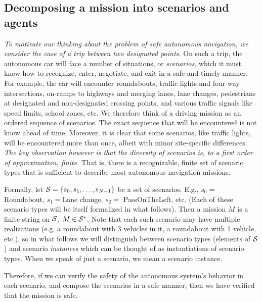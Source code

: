 \subsection{Decomposing a mission into scenarios and agents}
\label{scenarios and agents}
{\it To motivate our thinking about the problem of safe autonomous navigation, we consider the case of a trip between two designated points.}
On such a trip, the autonomous car will face a number of situations, or \emph{scenarios}, which it must know how to recognize, enter, negotiate, and exit in a safe and timely manner.
For example, the car will encounter roundabouts, 
traffic lights and four-way intersections, 
on-ramps to highways and merging lanes, 
lane changes, 
pedestrians at designated and non-designated crossing points,  
and various traffic signals like speed limits, school zones, etc.
We therefore think of a driving mission as an ordered sequence of scenarios.
The exact sequence that will be encountered is not know ahead of time. 
Moreover, it is clear that some scenarios, like traffic lights, will be encountered more than once, albeit with minor site-specific differences. 
{\it The key observation however is that the diversity of scenarios is, to a first order of approximation, finite.} 
That is, there is a recognizable, finite set of scenario types that is sufficient to describe most autonomous navigation missions.

Formally, let $\mathcal{S} = \{s_0,s_1,\ldots,s_{N-1}\}$ be a set of scenarios. 
E.g., $s_0 = $ Roundabout, $s_1 = $Lane change, $s_2 = $ PassOnTheLeft, etc. 
(Each of these scenario types will be itself formalized in what follows).
Then a mission $M$ is a finite string on $\mathcal{S}$, $M \in \mathcal{S}^*$.
Note that each such scenario may have multiple realizations (e.g. a roundabout with 3 vehicles in it, a roundabout with 1 vehicle, etc.), so in what follows we will distinguish between scenario types (elements of $\mathcal{S}$) and scenario \emph{instances} which can be thought of as instantiations of scenario types.
When we speak of just a scenario, we mean a scenario instance.

Therefore, if we can verify the safety of the autonomous system's behavior in each scenario,
and compose the scenarios in a safe manner, 
then we have verified that the mission is safe.

